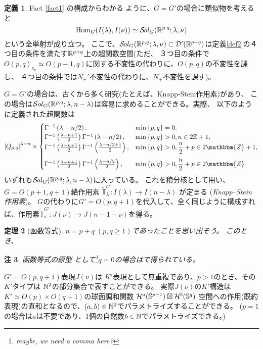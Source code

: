 \documentclass[12pt]{article} %
\newcommand{\Hom}{\mbox{\normalfont Hom}}
\newcommand{\Sol}{\mathcal{S}\!{\it ol}}
\newtheorem{theorem}{定理}
\newtheorem{remark}[theorem]{注}
\theoremstyle{definition}
\newtheorem{definition}[theorem]{定義}
\theoremstyle{exampstyle} \newtheorem{examp}[theorem]{Theorem}
\renewcommand{\Q}{Q_{p,q}}
\begin{document}
	\begin{definition}
		Fact \ref{fact1}
		の構成からわかる
		ように、$G=G'$の場合に類似物を考えると
		\begin{equation*}
		\Hom_G(I(\lambda),I(\nu))\simeq\Sol_G(\R^{p,q};\lambda,\nu)
		\end{equation*}
		という全単射が成り立つ。
		ここで、\;$\Sol_G(\R^{p,q};\lambda,\nu)\subset\mathcal{D}'(\R^{p+q})$は定義\ref{def2}の４つ目の条件を満たす$\mathbb{R}^{p+q}$上の超関数空間(ただ、
		３つ目の条件で$O(p,q)_{e_p}\simeq O(p-1,q)${に関する}不変性の代わりに、$O(p,q)$の不変性を課し、
		４つ目の条件では$N_+'$不変性の代わりに、$N_+$不変性を課す)。

		$G=G'$の場合は、古くから多く研究(たとえば、Knapp-Stein作用素)があり、
		この場合は$\mathcal{S}ol_G(\mathbb{R}^{p,q};\lambda,n-\lambda)$は容易に求めることができる。実際、
		以下のように定義された超関数は
		\begin{equation*}
			\myabs{\Q}^{\lambda-n}\times\begin{cases}
				\Gamma^{-1}\left( \lambda-n/2 \right),&\min\left\{ p,q \right\}=0,\\
				\Gamma^{-1}\left( \frac{\lambda-n+1}{2} \right)\Gamma^{-1}\left( \lambda-n/2 \right),&\min\left\{ p,q \right\}>0,n\in2\Z+1,\\
  \Gamma^{-1} \left( \frac{\lambda-n + 1}{2} \right) \Gamma ^{-1}\left( \frac{\lambda-n/2+
  1}{2} \right), &\min\left\{ p,q \right\}>0, \frac{n}{2} + p \in 2\mathbbm{Z}+ 1,\\[10pt]
  \Gamma^{-1} \left( \frac{\lambda-n + 1}{2} \right) \Gamma ^{-1}\left( \frac{\lambda-n/2}{2}
  \right), & \min\left\{ p,q \right\}>0,\frac{n}{2} + p \in 2\mathbbm{Z}
			\end{cases}
		\end{equation*}
		いずれも$\Sol_G(\R^{p,q};\lambda,n-\lambda)$に入っている。
		これを積分核として用い、$G=O(p+1,q+1)$絡作用素
		$\tilde{\mathbb{T}}^{G}_{\lambda}:I(\lambda)\to
		I(n-\lambda)$
		が定まる
		(\textit{Knapp--Stein 作用素})。
		$G$の代わりに$G'=O(p,q+1)$を代入して、全く同じように構成すれば、作用素$\tilde{\mathbb{T}}^{G'}_\nu:J(\nu)\to J(n-1-\nu)$を得る。
	\end{definition}
	\begin{theorem}[函数等式]
		$n=p+q\;(p,q\ge1)$で{あった}ことを思い出そう。
	このとき、
	\end{theorem}
	\begin{remark}
		函数等式の原型
		として\footnote{maybe, we need a comma here?}$q=0$の場合は\cite[Thm. 12.6]{kobayashi2015program}で得られている。
	\end{remark}
	$G'=O(p,q+1)$表現$J(\nu)$は $K'$表現として無重複であり、$p>1$のとき、その$K'$タイプは $\mathbb{N}^2$の部分集合で表すことができる。
	実際$J(\nu)$の$K'$構造は$K'\simeq O(p)\times O(q+1)$の球面調和関数
	$\mathcal{H}^a(\mathbb{S}^{p-1})\boxtimes\mathcal{H}^b(\mathbb{S}^q)$
	空間への作用(既約表現)の直和となるので、$(a,b)\in\mathbb{N}^2$でパラメトライズすることができる。
	($p=1$の場合は$a$は不要であり、1個の自然数$b\in\mathbb{N}$でパラメトライズできる。)
\end{document}
